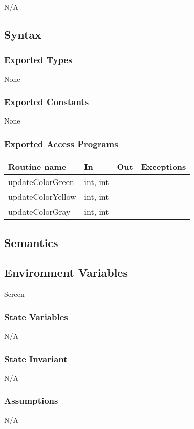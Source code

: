\documentclass[12pt]{article}
\begin{document}
N/A

\subsection* {Syntax}

\subsubsection* {Exported Types}

None

\subsubsection* {Exported Constants}

None

\subsubsection* {Exported Access Programs}

\begin{tabular}{| l | l | l | p{6cm} |}
\hline
\textbf{Routine name} & \textbf{In} & \textbf{Out} & \textbf{Exceptions}\\
\hline
updateColorGreen & int, int & ~ &  \\
\hline
updateColorYellow & int, int & ~ &  \\
\hline
updateColorGray & int, int & ~ &  \\
\hline
\end{tabular}

\subsection* {Semantics}

\subsection*{Environment Variables}

Screen

\subsubsection* {State Variables}
N/A
\subsubsection* {State Invariant}
N/A
\subsubsection* {Assumptions}
N/A
\end{document}
